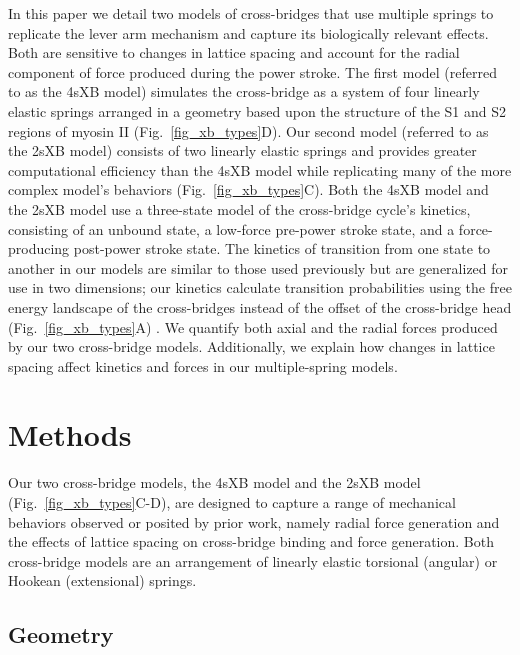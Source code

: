 \documentclass[]{article}
\begin{document}
In this paper we detail two models of cross-bridges that use multiple springs to replicate the lever arm mechanism and capture its biologically relevant effects.  
Both are sensitive to changes in lattice spacing and account for the radial component of force produced during the power stroke.  
The first model (referred to as the 4sXB model) simulates the cross-bridge as a system of four linearly elastic springs arranged in a geometry based upon the structure of the S1 and S2 regions of myosin II (Fig.~\ref{fig_xb_types}D).  
Our second model (referred to as the 2sXB model) consists of two linearly elastic springs and provides greater computational efficiency than the 4sXB model while replicating many of the more complex model's behaviors (Fig.~\ref{fig_xb_types}C). 
Both the 4sXB model and the 2sXB model use a three-state model of the cross-bridge cycle's kinetics, consisting of an unbound state, a low-force pre-power stroke state, and a force-producing post-power stroke state. 
The kinetics of transition from one state to another in our models are similar to those used previously but are generalized for use in two dimensions; our kinetics calculate transition probabilities using the free energy landscape of the cross-bridges instead of the offset of the cross-bridge head (Fig.~\ref{fig_xb_types}A) \citep{Pate1989, Daniel1998, Tanner2007}. 
We quantify both axial and the radial forces produced by our two cross-bridge models. 
Additionally, we explain how changes in lattice spacing affect kinetics and forces in our multiple-spring models. 

\section*{Methods}  %

Our two cross-bridge models, the 4sXB model and the 2sXB model (Fig.~\ref{fig_xb_types}C-D), are designed to capture a range of mechanical behaviors observed or posited by prior work, namely radial force generation and the effects of lattice spacing on cross-bridge binding and force generation.  
Both cross-bridge models are an arrangement of linearly elastic torsional (angular) or Hookean (extensional) springs.  

\subsection*{Geometry} %
\end{document}
